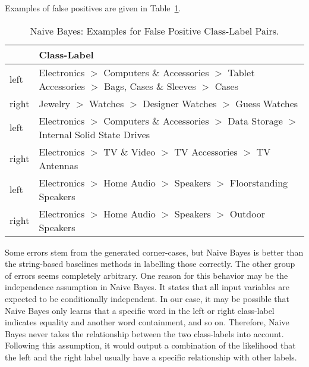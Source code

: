 Examples of false positives are given in Table~\ref{tab:naive-bayes-fp}.
\begin{table}[htbp]
    \begin{center}
        \begin{tabularx}{\textwidth}{lX}
            & Class-Label \\
            \hline
            left & Electronics $>$ Computers \& Accessories $>$ Tablet Accessories $>$ Bags, Cases \& Sleeves $>$ Cases \\
            right & Jewelry $>$ Watches $>$ Designer Watches $>$ Guess Watches \\
            \hline
            left & Electronics $>$ Computers \& Accessories $>$ Data Storage $>$ Internal Solid State Drives \\
            right & Electronics $>$ TV \& Video $>$ TV Accessories $>$ TV Antennas \\
            \hline
            left & Electronics $>$ Home Audio $>$ Speakers $>$ Floorstanding Speakers \\
            right & Electronics $>$ Home Audio $>$ Speakers $>$ Outdoor Speakers \\
        \end{tabularx}
        \caption{Naive Bayes: Examples for False Positive Class-Label Pairs.}
        \label{tab:naive-bayes-fp}
    \end{center}
\end{table}
Some errors stem from the generated corner-cases, but  Naive Bayes is better than the string-based baselines methods
in labelling those correctly.
The other group of errors seems completely arbitrary.
One reason for this behavior may be the  independence assumption in Naive Bayes.
It states that all input variables are expected to be conditionally independent.
In our case, it may be possible that Naive Bayes only learns that a specific word in the left or right class-label
indicates equality and another word containment, and so on.
Therefore, Naive Bayes never takes the relationship between the two class-labels into account.
Following this  assumption, it would output a combination of the likelihood that the left and the right label usually have
a specific relationship with other labels.

